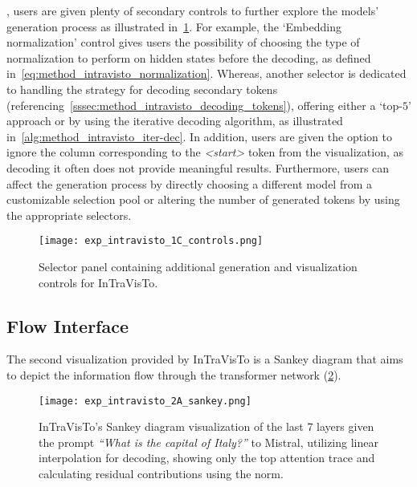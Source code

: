 , users are given plenty of secondary controls to further explore the models' generation process as illustrated in~\cref{fig:exp_intravisto_1_C}.
For example, the `Embedding normalization' control gives users the possibility of choosing the type of normalization to perform on hidden states before the decoding, as defined in~\cref{eq:method_intravisto_normalization}.
Whereas, another selector is dedicated to handling the strategy for decoding secondary tokens (referencing~\cref{sssec:method_intravisto_decoding_tokens}), offering either a `top-$5$' approach or by using the iterative decoding algorithm, as illustrated in~\cref{alg:method_intravisto_iter-dec}.
In addition, users are given the option to ignore the column corresponding to the \emph{<start>} token from the visualization, as decoding it often does not provide meaningful results.
Furthermore, users can affect the generation process by directly choosing a different model from a customizable selection pool or altering the number of generated tokens by using the appropriate selectors.

\begin{figure}[t!]
    \centering
    \texttt{[image: exp\_intravisto\_1C\_controls.png]}
    \caption{Selector panel containing additional generation and visualization controls for InTraVisTo.}
    \label{fig:exp_intravisto_1_C}
\end{figure}

\subsection{Flow Interface}\label{ssec:exp_intravisto_exp2}

The second visualization provided by InTraVisTo is a Sankey diagram that aims to depict the information flow through the transformer network (\cref{fig:exp_intravisto_2_A}).

\begin{figure}[t!]
    \centering
    \texttt{[image: exp\_intravisto\_2A\_sankey.png]}
    \caption[InTraVisTo's Sankey diagram visualization given the prompt \emph{``What is the capital of Italy?''} to Mistral.]{InTraVisTo's Sankey diagram visualization of the last 7 layers given the prompt \emph{``What is the capital of Italy?''} to Mistral, utilizing linear interpolation for decoding, showing only the top attention trace and calculating residual contributions using the norm.}
    \label{fig:exp_intravisto_2_A}
\end{figure}


